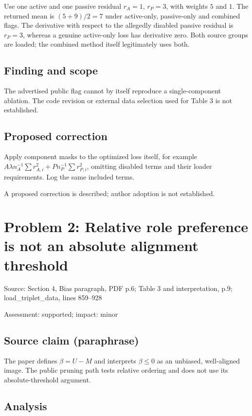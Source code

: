 \documentclass[11pt]{article}
\begin{document}
Use one active and one passive residual \(r_A=1\), \(r_P=3\), with weights \(5\) and \(1\). The returned mean is \((5+9)/2=7\) under active-only, passive-only and combined flags. The derivative with respect to the allegedly disabled passive residual is \(r_P=3\), whereas a genuine active-only loss has derivative zero. Both source groups are loaded; the combined method itself legitimately uses both.

\subsection*{Finding and scope}

The advertised public flag cannot by itself reproduce a single-component ablation. The code revision or external data selection used for Table 3 is not established.

\subsection*{Proposed correction}

Apply component masks to the optimized loss itself, for example \(A\lambda n_A^{-1}\sum r_{A,i}^2+P n_P^{-1}\sum r_{P,i}^2\), omitting disabled terms and their loader requirements. Log the same included terms.

A proposed correction is described; author adoption is not established.

\section*{Problem 2: Relative role preference is not an absolute alignment threshold}

Source: Section 4, Bias paragraph, PDF p.6; Table 3 and interpretation, p.9; load\_triplet\_data, lines 859–928

Assessment: supported; impact: minor

\subsection*{Source claim (paraphrase)}

The paper defines \(\beta=U-M\) and interprets \(\beta\le0\) as an unbiased, well-aligned image. The public pruning path tests relative ordering and does not use its absolute-threshold argument.

\subsection*{Analysis}
\end{document}
